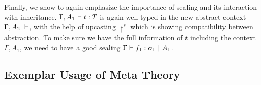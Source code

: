Finally, we show  to again emphasize the importance of sealing and its interaction with inheritance. ${ {\Gamma, A_1} \vdash {t} : {T} }$ is again well-typed in the new abstract context ${ {\Gamma, A_2} \ \vdash }$, with the help of upcasting $\uparrow^s$ which is showing compatibility between abstraction. To make sure we have the full information of $t$ including the context $\Gamma, A_1$, we need to have a good sealing ${ {\Gamma} \vdash {f_1} : {\sigma_1} \ |\ {A_1} }$.



\subsection{Exemplar Usage of Meta Theory}
